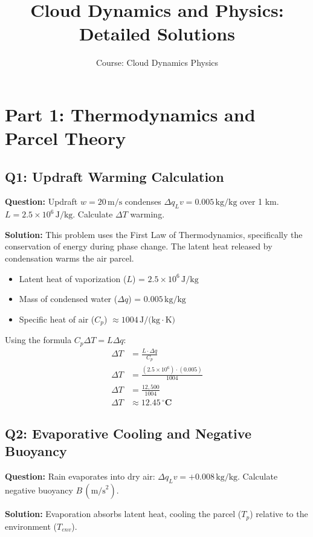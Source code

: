 \documentclass[11pt,a4paper]{article}
\title{\textbf{Cloud Dynamics and Physics: Detailed Solutions}}
\author{Course: Cloud Dynamics Physics}
\date{}
\begin{document}
\maketitle

\section*{Part 1: Thermodynamics and Parcel Theory}

\subsection*{Q1: Updraft Warming Calculation}
\textbf{Question:} Updraft $w=20\,\text{m/s}$ condenses $\Delta q_{L}v=0.005\,\text{kg/kg}$ over 1 km. $L=2.5\times10^{6}\,\text{J/kg}$. Calculate $\Delta T$ warming.

\textbf{Solution:}
This problem uses the First Law of Thermodynamics, specifically the conservation of energy during phase change. The latent heat released by condensation warms the air parcel.

\begin{itemize}
    \item Latent heat of vaporization ($L$) = $2.5 \times 10^6\,\text{J/kg}$
    \item Mass of condensed water ($\Delta q$) = $0.005\,\text{kg/kg}$
    \item Specific heat of air ($C_p$) $\approx 1004\,\text{J/(kg}\cdot\text{K)}$
\end{itemize}

Using the formula $C_p \Delta T = L \Delta q$:
\begin{align*}
    \Delta T &= \frac{L \cdot \Delta q}{C_p} \\
    \Delta T &= \frac{(2.5 \times 10^6) \cdot (0.005)}{1004} \\
    \Delta T &= \frac{12,500}{1004} \\
    \Delta T &\approx \mathbf{12.45\,^\circ\text{C}}
\end{align*}

\subsection*{Q2: Evaporative Cooling and Negative Buoyancy}
\textbf{Question:} Rain evaporates into dry air: $\Delta q_{L}v=+0.008\,\text{kg/kg}.$ Calculate negative buoyancy $B\,(\text{m/s}^{2})$.

\textbf{Solution:}
Evaporation absorbs latent heat, cooling the parcel ($T_p$) relative to the environment ($T_{env}$).
\end{document}
